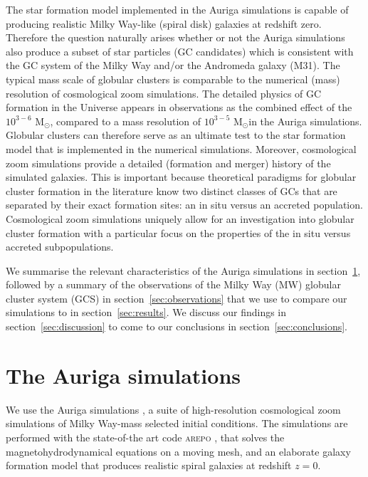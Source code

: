 \documentclass[a4paper,fleqn,usenatbib]{mnras}
\newcommand{\Sun}[0]{\ensuremath{_{\odot}}}
\begin{document}
The star formation model implemented in the Auriga simulations is capable of
producing realistic Milky Way-like (spiral disk) galaxies at redshift zero. Therefore
the question naturally arises whether or not the Auriga simulations also produce
a subset of star particles (GC candidates) which is consistent with the GC system
of the Milky Way and/or the Andromeda galaxy (M31). The typical mass scale of
globular clusters is comparable to the numerical (mass) resolution of cosmological
zoom simulations. The detailed physics of GC formation in the Universe appears in
observations as the combined effect of the $10^{3-6}$ M\Sun, compared to a mass
resolution of $10^{3-5}$ M\Sun in the Auriga simulations. Globular clusters can
therefore serve as an ultimate test to the star formation model that is implemented
in the numerical simulations. Moreover, cosmological zoom simulations provide a
detailed (formation and merger) history of the simulated galaxies. This is
important because theoretical paradigms for globular cluster formation in the
literature know two distinct classes of GCs that are separated by their exact
formation sites: an in situ versus an accreted population. Cosmological zoom
simulations uniquely allow for an investigation into globular cluster formation
with a particular focus on the properties of the in situ versus accreted subpopulations.


We summarise the relevant characteristics of the Auriga simulations in
section~\ref{sec:auriga}, followed by a summary of the observations of the
Milky Way (MW) globular cluster system (GCS) in section~\ref{sec:observations}
that we use to compare our simulations to in section~\ref{sec:results}. We
discuss our findings in section~\ref{sec:discussion} to come to our conclusions
in section~\ref{sec:conclusions}.


\section{The Auriga simulations}
\label{sec:auriga}
We use the Auriga simulations \citep[][hereafter G17]{2017MNRAS.467..179G}, a
suite of high-resolution cosmological zoom simulations of Milky Way-mass
selected initial conditions. The simulations are performed with the
state-of-the art code \textsc{arepo} \citep{2010MNRAS.401..791S,
2016MNRAS.455.1134P}, that solves the magnetohydrodynamical equations on a
moving mesh, and an elaborate galaxy formation model that produces realistic
spiral galaxies at redshift $z=0$.
\end{document}
